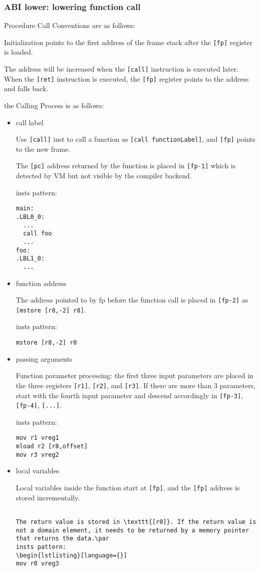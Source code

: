 \subsubsection{ABI lower: lowering function call}
    
Procedure Call Conventions are as follows:

Initialization points to the first address of the frame stack after the \texttt{[fp]} register is loaded.
    
The address will be increased when the \texttt{[call]}  instruction is executed later. When the \texttt{[ret]} instruction is executed, the \texttt{[fp]} register points to the address and falls back.
    
    
the Calling Process is as follows:
\begin{itemize}
    \item call label

Use  \texttt{[call]} inst to call a function as \texttt{[call functionLabel]}, and \texttt{[fp]} points to the new frame.\par
The \texttt{[pc]} address returned by the function is placed in \texttt{[fp-1]} which is detected by VM but not visible by the compiler backend.\par
insts pattern:
\begin{lstlisting}[language={}]
main:
.LBL0_0:
  ...
  call foo
  ...
foo:
.LBL1_0:
  ...
\end{lstlisting}
    \item function address

The address pointed to by fp before the function call is placed in  \texttt{[fp-2]} as \texttt{[mstore [r8,-2] r8]}.\par
insts pattern:
\begin{lstlisting}[language={}]
mstore [r8,-2] r8
\end{lstlisting}
    \item passing arguments

Function parameter processing: the first three input parameters are placed in the three registers \texttt{[r1]}, \texttt{[r2]}, and \texttt{[r3]}.
If there are more than 3 parameters, start with the fourth input parameter and descend accordingly in \texttt{[fp-3]}, \texttt{[fp-4]}, \texttt{[...]}. \par
insts pattern:
\begin{lstlisting}[language={}]
mov r1 vreg1
mload r2 [r8,offset]
mov r3 vreg2
\end{lstlisting}
    \item  local variables

Local variables inside the function start at \texttt{[fp]}, and the \texttt{[fp]} address is stored incrementally. 
\begin{lstlisting}[language={}]

The return value is stored in \texttt{[r0]}. If the return value is not a domain element, it needs to be returned by a memory pointer that returns the data.\par
insts pattern:
\begin{lstlisting}[language={}]
mov r0 vreg3
\end{lstlisting}
\end{itemize}

